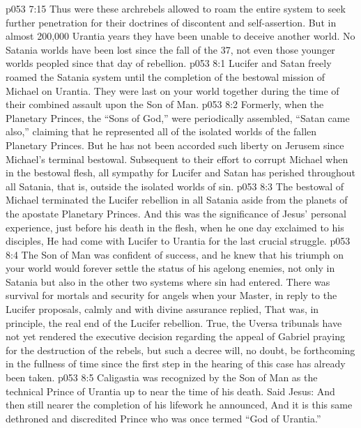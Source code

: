 \vs p053 7:15 Thus were these archrebels allowed to roam the entire system to seek further penetration for their doctrines of discontent and self\hyp{}assertion. But in almost 200,000 Urantia years they have been unable to deceive another world. No Satania worlds have been lost since the fall of the 37, not even those younger worlds peopled since that day of rebellion.
\vs p053 8:1 Lucifer and Satan freely roamed the Satania system until the completion of the bestowal mission of Michael on Urantia. They were last on your world together during the time of their combined assault upon the Son of Man.
\vs p053 8:2 Formerly, when the Planetary Princes, the “Sons of God,” were periodically assembled, “Satan came also,” claiming that he represented all of the isolated worlds of the fallen Planetary Princes. But he has not been accorded such liberty on Jerusem since Michael’s terminal bestowal. Subsequent to their effort to corrupt Michael when in the bestowal flesh, all sympathy for Lucifer and Satan has perished throughout all Satania, that is, outside the isolated worlds of sin.
\vs p053 8:3 \pc The bestowal of Michael terminated the Lucifer rebellion in all Satania aside from the planets of the apostate Planetary Princes. And this was the significance of Jesus’ personal experience, just before his death in the flesh, when he one day exclaimed to his disciples,  He had come with Lucifer to Urantia for the last crucial struggle.
\vs p053 8:4 The Son of Man was confident of success, and he knew that his triumph on your world would forever settle the status of his agelong enemies, not only in Satania but also in the other two systems where sin had entered. There was survival for mortals and security for angels when your Master, in reply to the Lucifer proposals, calmly and with divine assurance replied,  That was, in principle, the real end of the Lucifer rebellion. True, the Uversa tribunals have not yet rendered the executive decision regarding the appeal of Gabriel praying for the destruction of the rebels, but such a decree will, no doubt, be forthcoming in the fullness of time since the first step in the hearing of this case has already been taken.
\vs p053 8:5 Caligastia was recognized by the Son of Man as the technical Prince of Urantia up to near the time of his death. Said Jesus:  And then still nearer the completion of his lifework he announced,  And it is this same dethroned and discredited Prince who was once termed “God of Urantia.”
